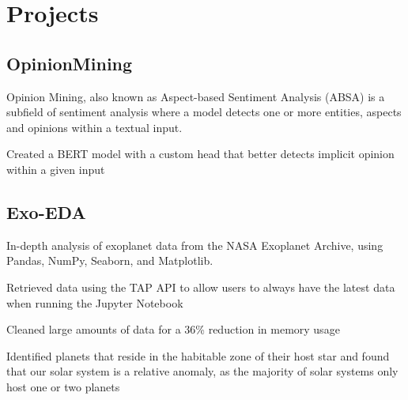 \documentclass[]{resume-template}
\begin{document}
\begin{minipage}[t]{0.66\textwidth} 


\section{Projects}\label{sec:projects}
\subsection{OpinionMining}\label{subsec:opinionmining}
\vspace{\topsep}
\begin{tightemize}
    \item Opinion Mining, also known as Aspect-based Sentiment Analysis (ABSA) is a subfield of sentiment analysis
    where a model detects one or more entities, aspects and opinions within a textual input.
    \item Created a BERT model with a custom head that better detects implicit opinion within a given input

\end{tightemize}
\subsection{Exo-EDA}\label{subsec:exo-eda}
\vspace{\topsep} %
\begin{tightemize}
\item In-depth analysis of exoplanet data from the NASA Exoplanet Archive, using Pandas, NumPy,
Seaborn, and Matplotlib.
\item Retrieved data using the TAP API to allow users to always have the latest data when running the Jupyter Notebook
\item Cleaned large amounts of data for a 36\% reduction in memory usage
\item Identified planets that reside in the habitable zone of their host star and found that our solar system is a
relative anomaly, as the majority of solar systems only host one or two planets
\end{tightemize}


\end{minipage}
\end{document}

